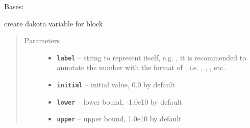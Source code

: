 \documentclass[letterpaper,10pt,english]{sphinxmanual}
\begin{document}

\begin{fulllineitems}
\label{src/apidocs/dakutils:genopt.dakutils.DakotaParam}
Bases: \href{https://docs.python.org/2/library/functions.html\#object}{}

create dakota variable for  block
\begin{quote}\begin{description}
\item[{Parameters}] \leavevmode\begin{itemize}
\item {} 
\textbf{\texttt{label}} -- string to represent itself, e.g. ,
it is recommended to annotate the number with the format of ,
i.e. , , , etc.

\item {} 
\textbf{\texttt{initial}} -- initial value, 0.0 by default

\item {} 
\textbf{\texttt{lower}} -- lower bound, -1.0e10 by default

\item {} 
\textbf{\texttt{upper}} -- upper bound, 1.0e10 by default

\end{itemize}

\end{description}\end{quote}

\begin{fulllineitems}
\label{src/apidocs/dakutils:genopt.dakutils.DakotaParam.initial}
\end{fulllineitems}


\begin{fulllineitems}
\label{src/apidocs/dakutils:genopt.dakutils.DakotaParam.label}
\end{fulllineitems}


\begin{fulllineitems}
\label{src/apidocs/dakutils:genopt.dakutils.DakotaParam.lower}
\end{fulllineitems}


\begin{fulllineitems}
\label{src/apidocs/dakutils:genopt.dakutils.DakotaParam.upper}
\end{fulllineitems}


\end{fulllineitems}
\end{document}
